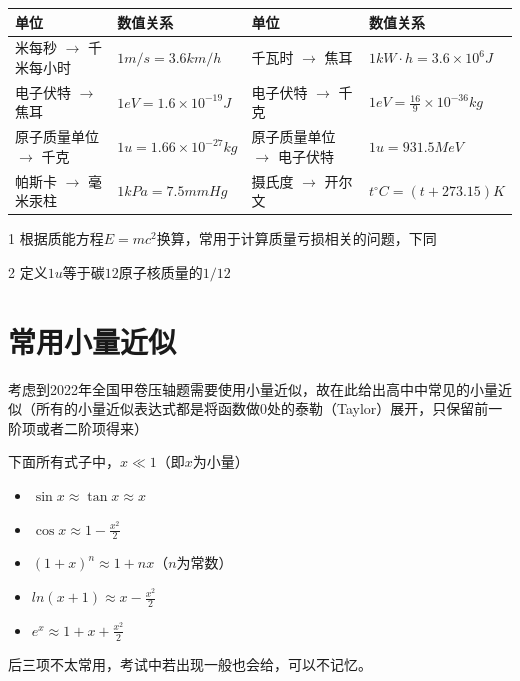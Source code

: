 \begin{table}[h]
\centering
\begin{threeparttable}
\begin{tabular}{|l|l||l|l|}
\hline
\textbf{单位}  & \textbf{数值关系} & \textbf{单位} & \textbf{数值关系}\\
\hline
米每秒 $\to$ 千米每小时  & $1m/s = 3.6km/h$ & 千瓦时 $\to$ 焦耳 & $1kW \cdot h = 3.6 \times 10^{6} J$\\
电子伏特 $\to$ 焦耳  & $1eV = 1.6 \times 10^{-19}J$ & 电子伏特 $\to$ 千克\tnote{1} & $1eV = \frac{16}{9} \times 10^{-36} kg$\\
原子质量单位\tnote{2} $\to$ 千克  & $1u = 1.66 \times 10^{-27}kg$ & 原子质量单位 $\to$ 电子伏特 & $1u = 931.5 MeV$\\
帕斯卡 $\to$ 毫米汞柱  & $1kPa = 7.5 mmHg$ & 摄氏度 $\to$ 开尔文 & $t^{\circ}C = (t + 273.15)K$\\
\hline

\hline
\end{tabular}
\begin{tablenotes}
\item[1] 根据质能方程$E=mc^2$换算，常用于计算质量亏损相关的问题，下同
\item[2] 定义$1u$等于碳$12$原子核质量的$1/12$
\end{tablenotes}
\end{threeparttable}
\end{table}

\section{常用小量近似}
\label{s_xljs}

考虑到2022年全国甲卷压轴题需要使用小量近似，故在此给出高中中常见的小量近似（所有的小量近似表达式都是将函数做0处的泰勒（Taylor）展开，只保留前一阶项或者二阶项得来）

下面所有式子中，$x \ll 1$（即$x$为小量）

\begin{itemize}
\item $\sin x \approx \tan x \approx x$
\item $\cos x \approx 1 - \frac{x^2}{2}$
\item $(1+x)^n \approx 1 + nx$（$n$为常数）
\item $ln(x+1) \approx x - \frac{x^2}{2}$
\item $e^x \approx 1 + x + \frac{x^2}{2}$
\end{itemize}

后三项不太常用，考试中若出现一般也会给，可以不记忆。

